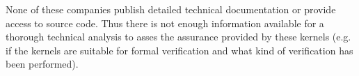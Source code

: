 None of these companies publish detailed technical documentation or provide
access to source code. Thus there is not enough information available for a
thorough technical analysis to asses the assurance provided by these kernels
(e.g. if the kernels are suitable for formal verification and what kind of
verification has been performed).
